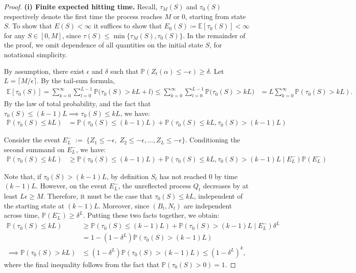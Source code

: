 \documentclass[10pt,a4paper]{amsart}
\theoremstyle{plain}
\theoremstyle{definition}
\theoremstyle{remark}
\newcommand{\E}{\mathbb{E}}
\newcommand{\pr}{\mathbb{P}}
\renewcommand{\Pr}{\pr}
\newcommand{\Exp}[1]{\mathbb{E} \left[ #1 \right]}
\begin{document}
\begin{proof}
\noindent\textbf{(i) Finite expected hitting time.} Recall, $\tau_M(S)$ and $\tau_0(S)$ respectively denote the first time the process reaches $M$ or $0$, starting from state $S$. To show that $E(S) < \infty$ it suffices to show that $E_0(S) \coloneqq \Exp{\tau_0(S)} < \infty$ for any $S \in [0,M]$, since $\tau(S) \leq \min\{\tau_M(S), \tau_0(S)\}$. In the remainder of the proof, we omit dependence of all quantities on the initial state $S$, for notational simplicity.

By assumption, there exist $\epsilon$ and $\delta$ such that $\Pr(Z_t(\alpha) \leq -\epsilon) \geq \delta$.  Let $L=\lceil M/\epsilon\rceil$.
By the tail-sum formula,
\begin{align*}
\E[\tau_0(S)] = \sum_{k = 0}^\infty \sum_{l=0}^{L-1} \Pr\big(\tau_0(S)> kL + l\big) \leq \sum_{k = 0}^\infty \sum_{l=0}^{L-1} \Pr\big(\tau_0(S)> kL\big) &= L\sum_{k=0}^{\infty}\mathbb{P}\left(\tau_0(S) > kL\right).
\end{align*}
By the law of total probability, and the fact that $\tau_0(S) \leq (k-1)L \implies \tau_0(S) \leq kL$, we have:
\begin{align}\label{eq:expect-tau0}
\mathbb{P}\left(\tau_0(S) \leq kL\right) &= \mathbb{P}\left(\tau_0(S) \leq (k-1)L\right) + \mathbb{P}\left(\tau_0(S) \leq kL , \tau_0(S) > (k-1)L\right)
\end{align}

Consider the event $
E^-_L \;:=\; \{Z_1\le -\epsilon,\; Z_2\le -\epsilon,\ldots, Z_L\le -\epsilon\}.$ Conditioning the second summand on $E_L^-$, we have:
\begin{align*}
\mathbb{P}\left(\tau_0(S) \leq kL\right) &\geq \mathbb{P}\left(\tau_0(S) \leq (k-1)L\right) + \mathbb{P}\left(\tau_0(S) \leq kL , \tau_0(S) > (k-1)L \mid E_L^-\right)\mathbb{P}(E_L^-)
\end{align*}

Note that, if $\tau_0(S) > (k-1)L$, by definition $S_t$ has not reached 0 by time $(k-1)L$. However, on the event $E_L^-$, the unreflected process $Q_t$ decreases by at least $L\epsilon \geq M$. Therefore, it must be the case that $\tau_0(S) \leq kL$, independent of the starting state at $(k-1)L$. Moreover, since $(B_t,N_t)$ are independent across time,
\(\Pr(E^-_L)\ge \delta^L\). Putting these two facts together, we obtain:
\begin{align*}
\mathbb{P}\left(\tau_0(S) \leq kL\right) &\geq \mathbb{P}\left(\tau_0(S) \leq (k-1)L\right) + \mathbb{P}\left( \tau_0(S) > (k-1)L \mid E_L^-\right)\delta^L\\
&= 1-(1-\delta^L)\mathbb{P}\left(\tau_0(S)>(k-1)L\right)
\\
\implies \mathbb{P}\left(\tau_0(S) > kL\right) &\leq (1-\delta^L)\mathbb{P}\left(\tau_0(S) > (k-1)L\right) \leq (1-\delta^L)^k,
\end{align*}
where the final inequality follows from the fact that $\mathbb{P}(\tau_0(S) > 0) = 1$.


\end{proof}
\end{document}
